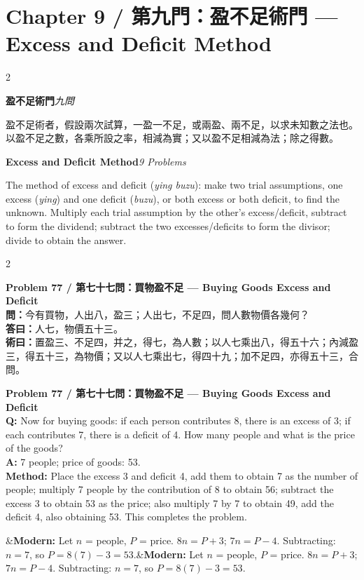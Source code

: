 \documentclass[11pt,a4paper]{article}
\newcommand{\bilingualproblem}[4]{%
  \begin{paracol}{2}
  \begin{leftcolumn}
  \noindent\textbf{\color{problemcolor}#1}\\[0.2cm]
  #2
  \end{leftcolumn}
  \switchcolumn
  \noindent\textbf{\color{problemcolor}#1}\\[0.2cm]
  #3
  \end{paracol}
  \ifx&#4&\else\vspace{0.3cm}\noindent#4\fi
  \vspace{0.5cm}
}
\newcommand{\wen}[1]{\textcolor{problemcolor}{\textbf{問：}}#1}
\newcommand{\da}[1]{\textcolor{answercolor}{\textbf{答曰：}}#1}
\newcommand{\shu}[1]{\textcolor{methodcolor}{\textbf{術曰：}}#1}
\newcommand{\wenen}[1]{\textcolor{problemcolor}{\textbf{Q:}} #1}
\newcommand{\daen}[1]{\textcolor{answercolor}{\textbf{A:}} #1}
\newcommand{\shuen}[1]{\textcolor{methodcolor}{\textbf{Method:}} #1}
\begin{document}
\newpage

\section{Chapter 9 / 第九門：盈不足術門 --- Excess and Deficit Method}
\label{sec:yingbuzu}

\begin{paracol}{2}
\begin{leftcolumn}
\noindent\textbf{盈不足術門}\quad\textit{九問}

盈不足術者，假設兩次試算，一盈一不足，或兩盈、兩不足，以求未知數之法也。以盈不足之數，各乘所設之率，相減為實；又以盈不足相減為法；除之得數。
\end{leftcolumn}

\switchcolumn

\noindent\textbf{Excess and Deficit Method}\quad\textit{9 Problems}

The method of excess and deficit (\textit{ying buzu}): make two trial assumptions, one excess (\textit{ying}) and one deficit (\textit{buzu}), or both excess or both deficit, to find the unknown. Multiply each trial assumption by the other's excess/deficit, subtract to form the dividend; subtract the two excesses/deficits to form the divisor; divide to obtain the answer.
\end{paracol}

\vspace{0.5cm}

\bilingualproblem{Problem 77 / 第七十七問：買物盈不足 --- Buying Goods Excess and Deficit}{
\wen{今有買物，人出八，盈三；人出七，不足四，問人數物價各幾何？}\\[0.2cm]
\da{人七，物價五十三。}\\[0.2cm]
\shu{置盈三、不足四，并之，得七，為人數；以人七乘出八，得五十六；內減盈三，得五十三，為物價；又以人七乘出七，得四十九；加不足四，亦得五十三，合問。}
}{
\wenen{Now for buying goods: if each person contributes 8, there is an excess of 3; if each contributes 7, there is a deficit of 4. How many people and what is the price of the goods?}\\[0.2cm]
\daen{7 people; price of goods: 53.}\\[0.2cm]
\shuen{Place the excess 3 and deficit 4, add them to obtain 7 as the number of people; multiply 7 people by the contribution of 8 to obtain 56; subtract the excess 3 to obtain 53 as the price; also multiply 7 by 7 to obtain 49, add the deficit 4, also obtaining 53. This completes the problem.}
}{\textbf{Modern:} Let $n$ = people, $P$ = price. $8n = P + 3$; $7n = P - 4$. Subtracting: $n = 7$, so $P = 8(7) - 3 = 53$.}
\end{document}
